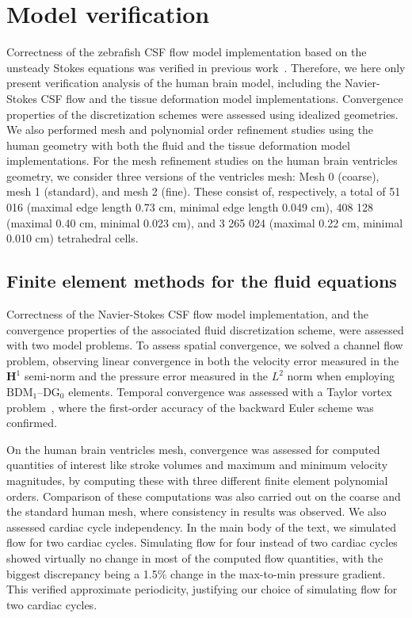 \documentclass{template}
\begin{document}
{}

\newpage
\appendix

\section{Model verification}
Correctness of the zebrafish CSF flow model implementation based on the
unsteady Stokes equations was verified in previous work~\citep{Herlyng2025AdvectionDiffusion}.
Therefore, we here only present verification analysis of the human brain model,
including the Navier-Stokes CSF flow and the tissue deformation model implementations.
Convergence properties of the discretization schemes were assessed using idealized
geometries. We also performed mesh and polynomial order refinement studies using the human
geometry with both the fluid and the tissue deformation model implementations.
For the mesh refinement studies on the human brain ventricles geometry,
we consider three versions of the ventricles mesh: Mesh 0 (coarse),
mesh 1 (standard), and mesh 2 (fine). These consist of, respectively,
a total of 51 016 (maximal edge length 0.73 cm, minimal edge length 0.049 cm),
408 128 (maximal 0.40 cm, minimal 0.023 cm),
and 3 265 024 (maximal 0.22 cm, minimal 0.010 cm) tetrahedral cells.

\subsection{Finite element methods for the fluid equations}\label{sec:flow_model_verification}
Correctness of the Navier-Stokes CSF flow model implementation, and the convergence properties of
the associated fluid discretization scheme, were assessed with two
model problems. To assess spatial convergence, we solved a channel flow
problem, observing linear convergence in both the velocity error measured
in the $\bm{H}^1$ semi-norm and the pressure error measured in the $L^2$ norm
when employing $\mathrm{BDM}_1$--$\mathrm{DG}_0$ elements.
Temporal convergence was assessed with a Taylor vortex
problem~\citep{Karniadakis2005Verification}, where the first-order
accuracy of the backward Euler scheme was confirmed.

On the human brain ventricles mesh, convergence was assessed for computed quantities
of interest like stroke volumes and maximum and minimum velocity
magnitudes, by computing these with three different finite element
polynomial orders. Comparison of these computations was also
carried out on the coarse and the standard human mesh,
where consistency in results was observed.
We also assessed cardiac cycle independency. In the main body of the text,
we simulated flow for two cardiac cycles. Simulating flow for four instead of two
cardiac cycles showed virtually no change in most of the computed flow
quantities, with the biggest discrepancy being a 1.5\% change in the max-to-min pressure
gradient. This verified approximate periodicity,
justifying our choice of simulating flow for two cardiac cycles.
\end{document}
